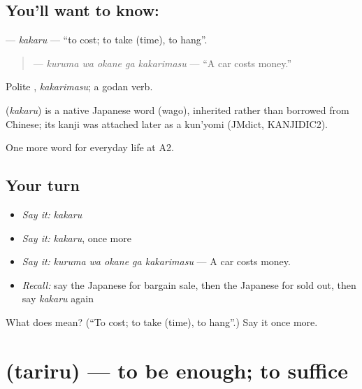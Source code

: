 \subsection*{You'll want to know: }
\textbf{} — \emph{kakaru} — \textquotedblleft{}to cost; to take (time), to hang\textquotedblright{}.

\begin{quote}
\textbf{  } — \emph{kuruma wa okane ga kakarimasu} — \textquotedblleft{}A car costs money.\textquotedblright{}
\end{quote}

Polite \textbf{}, \emph{kakarimasu}; a godan verb.

\begin{cousinweb}
\textbf{} (\emph{kakaru}) is a native Japanese word (wago), inherited rather than borrowed from Chinese; its kanji was attached later as a kun'yomi (JMdict, KANJIDIC2).
\end{cousinweb}

\begin{grammarlens}[title={What you've built}]
One more word for everyday life at A2.
\end{grammarlens}

\subsection*{Your turn}
\begin{itemize}
\raggedright
  \item \emph{Say it:} \emph{kakaru}
  \item \emph{Say it:} \emph{kakaru}, once more
  \item \emph{Say it:} \emph{kuruma wa okane ga kakarimasu} — A car costs money.
  \item \emph{Recall:} say the Japanese for bargain sale, then the Japanese for sold out, then say \emph{kakaru} again
\end{itemize}

\begin{tcolorbox}[breakable,colback=teal!4,colframe=teal!35!black,title={Before you move on}]
What does  mean? (\textquotedblleft{}To cost; to take (time), to hang\textquotedblright{}.) Say it once more.
\end{tcolorbox}
\section[\texorpdfstring{\ja{たりる} (tariru)}{たりる (tariru)}]{ (tariru) — to be enough; to suffice}

